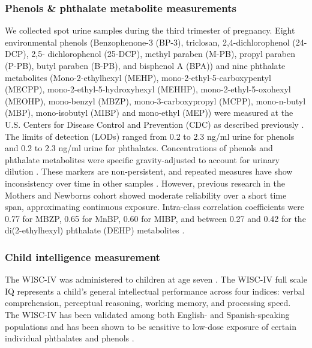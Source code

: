 \subsubsection{Phenols \& phthalate metabolite measurements}
We collected spot urine samples during the third trimester of pregnancy. Eight environmental phenols (Benzophenone-3 (BP-3), triclosan, 2,4-dichlorophenol (24-DCP), 2,5- dichlorophenol (25-DCP), methyl paraben (M-PB), propyl paraben (P-PB), butyl paraben (B-PB), and bisphenol A (BPA)) and nine phthalate metabolites (Mono-2-ethylhexyl (MEHP), mono-2-ethyl-5-carboxypentyl (MECPP), mono-2-ethyl-5-hydroxyhexyl (MEHHP), mono-2-ethyl-5-oxohexyl (MEOHP), mono-benzyl (MBZP), mono-3-carboxypropyl (MCPP), mono-n-butyl (MBP), mono-isobutyl (MIBP) and mono-ethyl (MEP)) were measured at the U.S. Centers for Disease Control and Prevention (CDC) as described previously \cite{ye2005automated, calafat2008exposure, silva2004urinary}. The limits of detection (LODs) ranged from 0.2 to 2.3 ng/ml urine for phenols and 0.2 to 2.3 ng/ml urine for phthalates. Concentrations of phenols and phthalate metabolites were specific gravity-adjusted to account for urinary dilution \cite{hauser2004temporal}. These markers are non-persistent, and repeated measures have show inconsistency over time in other samples \cite{fisher2015bisphenol}. However, previous research in the Mothers and Newborns cohort showed moderate reliability over a short time span, approximating continuous exposure. Intra-class correlation coefficients were 0.77 for MBZP, 0.65 for MnBP, 0.60 for MIBP, and between 0.27 and 0.42 for the di(2-ethylhexyl) phthalate (DEHP) metabolites \cite{whyatt2012maternal, factor2014persistent}.

\subsubsection{Child intelligence measurement}
The WISC-IV was administered to children at age seven \cite{wechsler2003}. The WISC-IV full scale IQ represents a child's general intellectual performance across four indices: verbal comprehension, perceptual reasoning, working memory, and processing speed. The WISC-IV has been validated among both English- and Spanish-speaking populations and has been shown to be sensitive to low-dose exposure of certain individual phthalates and phenols \cite{factor2014persistent, guo2020prenatal}.

